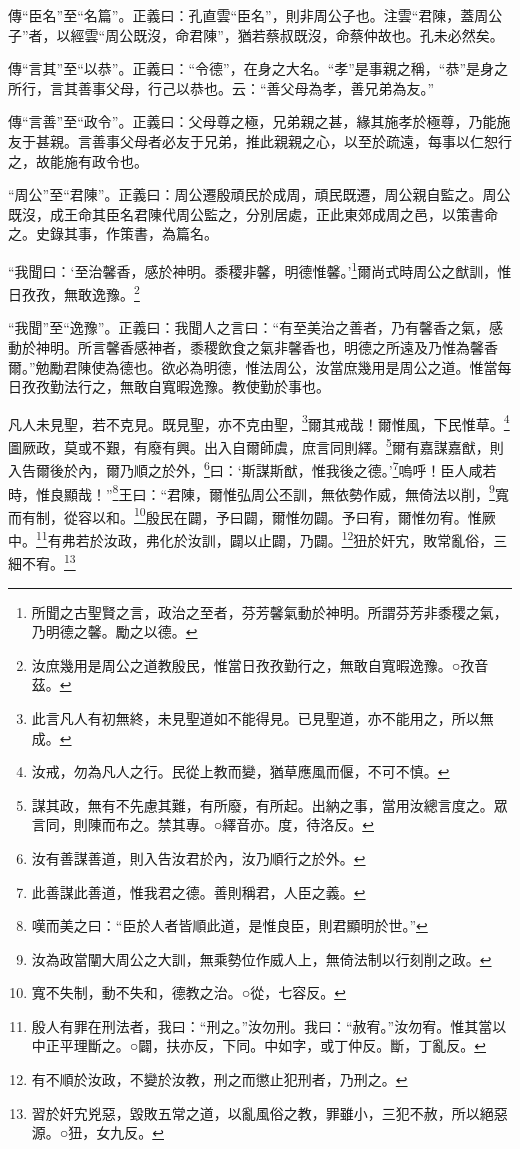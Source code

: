 {\noindent\zhuan{}\fzbyks 傳“臣名”至“名篇”。正義曰：孔直雲“臣名”，則非周公子也。注雲“君陳，蓋周公子”者，以經雲“周公既沒，命君陳”，猶若蔡叔既沒，命蔡仲故也。孔未必然矣。 \par}

{\noindent\zhuan{}\fzbyks 傳“言其”至“以恭”。正義曰：“令德”，在身之大名。“孝”是事親之稱，“恭”是身之所行，言其善事父母，行己以恭也。云：“善父母為孝，善兄弟為友。” \par}

{\noindent\zhuan{}\fzbyks 傳“言善”至“政令”。正義曰：父母尊之極，兄弟親之甚，緣其施孝於極尊，乃能施友于甚親。言善事父母者必友于兄弟，推此親親之心，以至於疏遠，每事以仁恕行之，故能施有政令也。 \par}

{\noindent\shu{}\fzkt “周公”至“君陳”。正義曰：周公遷殷頑民於成周，頑民既遷，周公親自監之。周公既沒，成王命其臣名君陳代周公監之，分別居處，正此東郊成周之邑，以策書命之。史錄其事，作策書，為篇名。 \par}

“我聞曰：‘至治馨香，感於神明。黍稷非馨，明德惟馨。’\footnote{所聞之古聖賢之言，政治之至者，芬芳馨氣動於神明。所謂芬芳非黍稷之氣，乃明德之馨。勵之以德。}爾尚式時周公之猷訓，惟日孜孜，無敢逸豫。\footnote{汝庶幾用是周公之道教殷民，惟當日孜孜勤行之，無敢自寬暇逸豫。○孜音茲。}

{\noindent\shu{}\fzkt “我聞”至“逸豫”。正義曰：我聞人之言曰：“有至美治之善者，乃有馨香之氣，感動於神明。所言馨香感神者，黍稷飲食之氣非馨香也，明德之所遠及乃惟為馨香爾。”勉勵君陳使為德也。欲必為明德，惟法周公，汝當庶幾用是周公之道。惟當每日孜孜勤法行之，無敢自寬暇逸豫。教使勤於事也。 \par}

凡人未見聖，若不克見。既見聖，亦不克由聖，\footnote{此言凡人有初無終，未見聖道如不能得見。已見聖道，亦不能用之，所以無成。}爾其戒哉！爾惟風，下民惟草。\footnote{汝戒，勿為凡人之行。民從上教而變，猶草應風而偃，不可不慎。}圖厥政，莫或不艱，有廢有興。出入自爾師虞，庶言同則繹。\footnote{謀其政，無有不先慮其難，有所廢，有所起。出納之事，當用汝總言度之。眾言同，則陳而布之。禁其專。○繹音亦。度，待洛反。}爾有嘉謀嘉猷，則入告爾後於內，爾乃順之於外，\footnote{汝有善謀善道，則入告汝君於內，汝乃順行之於外。}曰：‘斯謀斯猷，惟我後之德。’\footnote{此善謀此善道，惟我君之德。善則稱君，人臣之義。}嗚呼！臣人咸若時，惟良顯哉！”\footnote{嘆而美之曰：“臣於人者皆順此道，是惟良臣，則君顯明於世。”}王曰：“君陳，爾惟弘周公丕訓，無依勢作威，無倚法以削，\footnote{汝為政當闡大周公之大訓，無乘勢位作威人上，無倚法制以行刻削之政。}寬而有制，從容以和。\footnote{寬不失制，動不失和，德教之治。○從，七容反。}殷民在闢，予曰闢，爾惟勿闢。予曰宥，爾惟勿宥。惟厥中。\footnote{殷人有罪在刑法者，我曰：“刑之。”汝勿刑。我曰：“赦宥。”汝勿宥。惟其當以中正平理斷之。○闢，扶亦反，下同。中如字，或丁仲反。斷，丁亂反。}有弗若於汝政，弗化於汝訓，闢以止闢，乃闢。\footnote{有不順於汝政，不變於汝教，刑之而懲止犯刑者，乃刑之。}狃於奸宄，敗常亂俗，三細不宥。\footnote{習於奸宄兇惡，毀敗五常之道，以亂風俗之教，罪雖小，三犯不赦，所以絕惡源。○狃，女九反。}


